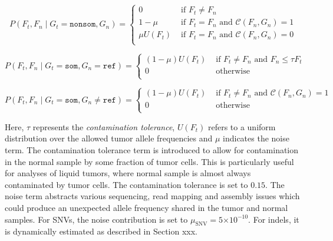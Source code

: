 \documentclass{article}
\newcommand{\e}[1]{\ensuremath{\times 10^{#1}}}
\begin{document}
\begin{equation*}
P(F_t, F_n \mid G_t = \texttt{nonsom}, G_n)=
\begin{cases}
	0 & \text{ if } F_t \neq F_n \\
	1-\mu & \text{ if } F_t = F_n \text{ and }\mathcal{C}(F_n, G_n) = 1 \\
	\mu U(F_t) & \text{ if } F_t = F_n \text{ and }\mathcal{C}(F_n, G_n) = 0 \\
\end{cases}
\end{equation*}

\begin{equation*}
P(F_t, F_n \mid G_t = \texttt{som}, G_n = \texttt{ref})=
\begin{cases}
	(1-\mu)U(F_t) & \text{ if } F_t \neq F_n \text{ and } F_n \leq \tau F_t \\
	0 & \text{ otherwise } \\
\end{cases}
\end{equation*}

\begin{equation*}
P(F_t, F_n \mid G_t = \texttt{som}, G_n \neq \texttt{ref})=
\begin{cases}
	(1-\mu)U(F_t) & \text{ if } F_t \neq F_n \text{ and } \mathcal{C}(F_n, G_n) = 1 \\
	0 & \text{ otherwise } \\
\end{cases}
\end{equation*}

\noindent Here, $\tau$ represents the {\em contamination tolerance}, $U(F_t)$ refers to a uniform distribution over the allowed tumor allele frequencies and $\mu$ indicates the noise term. The contamination tolerance term is introduced to allow for contamination in the normal sample by some fraction of tumor cells. This is particularly useful for analyses of liquid tumors, where normal sample is almost always contaminated by tumor cells. The contamination tolerance is set to $0.15$. The noise term abstracts various sequencing, read mapping and assembly issues which could produce an unexpected allele frequency shared in the tumor and normal samples. For SNVs, the noise contribution is set to $\mu_{\text{SNV}} = 5\e{-10}$. For indels, it is dynamically estimated as described in Section xxx.

\end{document}

